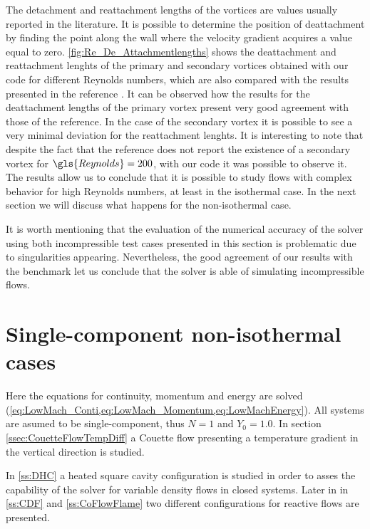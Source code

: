 The detachment and reattachment lengths of the vortices are values usually reported in the literature. It is possible to determine the position of deattachment by finding the point along the wall where the velocity gradient acquires a value equal to zero. %
 \cref{fig:Re_De_Attachmentlengths} shows the deattachment and reattachment lenghts of the primary and secondary vortices obtained with our code for different Reynolds numbers, which are also compared with the results presented in the reference \cite{biswasBackwardFacingStepFlows2004}. It can be observed how the results for the deattachment lengths of the primary vortex present very good agreement with those of the reference. In the case of the secondary vortex it is possible to see a very minimal deviation for the reattachment lenghts. It is interesting to note that despite the fact that the reference does not report the existence of a secondary vortex for $\gls{Reynolds} = 200$, with our code it was possible to observe it. The results allow us to conclude that it is possible to study flows with complex behavior for high Reynolds numbers, at least in the isothermal case. In the next section we will discuss what happens for the non-isothermal case.

It is worth mentioning that the evaluation of the numerical accuracy of the solver using both incompressible test cases presented in this section is problematic due to singularities appearing. Nevertheless, the good agreement of our results with the benchmark let us conclude that the solver is able of simulating incompressible flows.



\section{Single-component non-isothermal cases} \label{sec:SinCompNonIsothermCase}
Here the equations for continuity, momentum and energy are solved (\cref{eq:LowMach_Conti,eq:LowMach_Momentum,eq:LowMachEnergy}). All systems are asumed to be single-component, thus $N = 1$ and $Y_0 = 1.0$.
In section \cref{ssec:CouetteFlowTempDiff} a Couette flow presenting a temperature gradient in the vertical direction is studied. 

In \cref{ss:DHC} a heated square cavity configuration is studied in order to asses the capability of the solver for variable density flows in closed systems. Later in in \cref{ss:CDF} and \cref{ss:CoFlowFlame} two different configurations for reactive flows are presented. 


